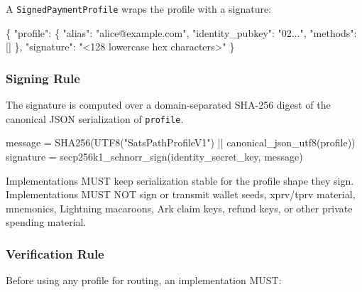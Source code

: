\documentclass[
]{article}
\newenvironment{Shaded}{}{}
\newcommand{\DataTypeTok}[1]{\textcolor[rgb]{0.56,0.13,0.00}{#1}}
\newcommand{\FunctionTok}[1]{\textcolor[rgb]{0.02,0.16,0.49}{#1}}
\newcommand{\NormalTok}[1]{#1}
\newcommand{\OtherTok}[1]{\textcolor[rgb]{0.00,0.44,0.13}{#1}}
\newcommand{\StringTok}[1]{\textcolor[rgb]{0.25,0.44,0.63}{#1}}
\begin{document}
A \texttt{SignedPaymentProfile} wraps the profile with a signature:

\begin{Shaded}
\begin{Highlighting}[]
\FunctionTok{\{}
  \DataTypeTok{"profile"}\FunctionTok{:} \FunctionTok{\{}
    \DataTypeTok{"alias"}\FunctionTok{:} \StringTok{"alice@example.com"}\FunctionTok{,}
    \DataTypeTok{"identity\_pubkey"}\FunctionTok{:} \StringTok{"02..."}\FunctionTok{,}
    \DataTypeTok{"methods"}\FunctionTok{:} \OtherTok{[]}
  \FunctionTok{\},}
  \DataTypeTok{"signature"}\FunctionTok{:} \StringTok{"\textless{}128 lowercase hex characters\textgreater{}"}
\FunctionTok{\}}
\end{Highlighting}
\end{Shaded}

\hypertarget{signing-rule}{%
\subsubsection{Signing Rule}\label{signing-rule}}

The signature is computed over a domain-separated SHA-256 digest of the
canonical JSON serialization of \texttt{profile}.

\begin{Shaded}
\begin{Highlighting}[]
\NormalTok{message = SHA256(UTF8("SatsPathProfileV1") || canonical\_json\_utf8(profile))}
\NormalTok{signature = secp256k1\_schnorr\_sign(identity\_secret\_key, message)}
\end{Highlighting}
\end{Shaded}

Implementations MUST keep serialization stable for the profile shape
they sign. Implementations MUST NOT sign or transmit wallet seeds,
xprv/tprv material, mnemonics, Lightning macaroons, Ark claim keys,
refund keys, or other private spending material.

\hypertarget{verification-rule}{%
\subsubsection{Verification Rule}\label{verification-rule}}

Before using any profile for routing, an implementation MUST:
\end{document}

